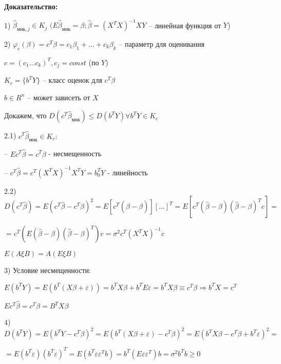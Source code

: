 \documentclass{article}
\begin{document}
\begin{tcolorbox}
\textbf{Доказательство:}\par

\vspace{1mm}
1) $\hat{\beta}_{\text{мнк}, j} \in K_j$ $(E\hat{\beta}_{\text{мнк}} = \beta; \hat{\beta} = (X^TX)^{-1}XY $ -- линейная функция от $Y$) \par

\vspace{1mm}
2) $\varphi_c(\beta) = c^T\beta = c_1\beta_1 + ... + c_k\beta_k$ -- параметр для оценивания\par
$c = (c_1 ... c_k)^T, c_j = const$ (по $Y$)\par
$K_c = \{b^TY\}$ -- класс оценок для $c^T\beta$\par
$b \in R^n$ -- может зависеть от $X$\par
Докажем, что $D(c^T\hat{\beta}_{\text{мнк}}) \leq D(b^TY) \forall b^TY \in K_c$\par

\vspace{1mm}
2.1) $c^T \hat{\beta}_{\text{мнк}} \in K_c:$\par
-- $E c^T\hat{\beta} = c^T\beta$ - несмещенность\par
-- $c^T\hat{\beta} = c^T(X^TX)^{-1}X^TY = b_0^TY$ - линейность\par

\vspace{1mm}
2.2) $D(c^T\hat{\beta}) = E(c^T\hat{\beta} - c^T\beta)^2 = E[c^T(\hat{\beta} - \beta)][...]^T = E[c^T(\hat{\beta} - \beta)(\hat{\beta} - \beta)^Tc] = $\par
$ = c^T(E(\hat{\beta} - \beta)(\hat{\beta} - \beta)^T)c = \sigma^2c^T(X^TX)^{-1}c$ \par
\vspace{1mm}
$E(A \xi B) = A(E\xi B)$\par

\vspace{1mm}
3) Условие несмещенности: \par
$E(b^TY) = E(b^T(X\beta + \varepsilon)) = b^TX\beta + b^TE\varepsilon = b^TX\beta \equiv c^T \beta \Longrightarrow b^TX = c^T$\par

\vspace{1mm}
$Ec^T \hat{\beta} = c^T \beta = B^TX\beta$

\vspace{1mm}
4) $D(b^TY) = E(b^TY-c^T\beta)^2 = E(b^T(X\beta + \varepsilon) - c^T\beta)^2 = E(b^TX\beta - c^T\beta + b^T\varepsilon)^2 = $ \par 
$ = E(b^T\varepsilon)(b^T\varepsilon)^T = E(b^T \varepsilon \varepsilon^T b) = b^T(E\varepsilon \varepsilon^T)b = \sigma^2b^Tb \geq 0$
\end{tcolorbox}
\end{document}
